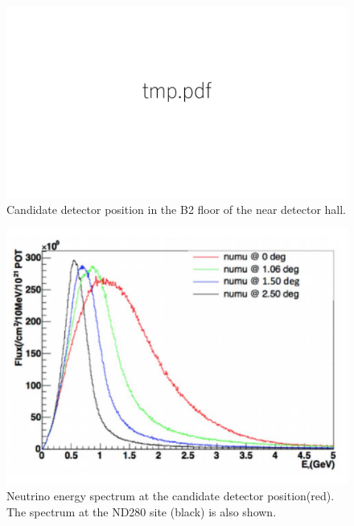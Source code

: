 \begin{figure}[tbh]
\begin{center}
\includegraphics[width=0.6\linewidth]{fig/tmp.pdf}
\end{center}
\caption{
Candidate detector position in the B2 floor of the near detector hall.
}
\label{fig:location}
\end{figure}

\begin{figure}[tbh]
\begin{center}
\includegraphics[width=0.6\linewidth]{fig/fluxes.pdf}
\end{center}
\caption{
Neutrino energy spectrum at the candidate detector position(red).
The spectrum at the ND280 site (black) is also shown.
}
\label{fig:b2flux}
\end{figure}


